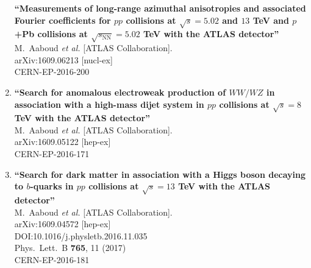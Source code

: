 \documentclass{article}
\begin{document}
\begin{enumerate}
{\bf ``Measurements of long-range azimuthal anisotropies and associated Fourier coefficients for $pp$ collisions at $\sqrt{s}=5.02$ and $13$ TeV and $p$+Pb collisions at $\sqrt{s_{\mathrm{NN}}}=5.02$ TeV with the ATLAS detector''}
  \\{}M.~Aaboud {\it et al.} [ATLAS Collaboration].
  \\{}arXiv:1609.06213 [nucl-ex]
  \\{}CERN-EP-2016-200
\item%
{\bf ``Search for anomalous electroweak production of $WW/WZ$ in association with a high-mass dijet system in $pp$ collisions at $\sqrt{s}=8$ TeV with the ATLAS detector''}
  \\{}M.~Aaboud {\it et al.} [ATLAS Collaboration].
  \\{}arXiv:1609.05122 [hep-ex]
  \\{}CERN-EP-2016-171
\item%
{\bf ``Search for dark matter in association with a Higgs boson decaying to $b$-quarks in $pp$ collisions at $\sqrt{s} = 13$ TeV with the ATLAS detector''}
  \\{}M.~Aaboud {\it et al.} [ATLAS Collaboration].
  \\{}arXiv:1609.04572 [hep-ex]
  \\{}DOI:10.1016/j.physletb.2016.11.035
  \\{}Phys.\ Lett.\ B {\bf 765}, 11 (2017)
  \\{}CERN-EP-2016-181


\end{enumerate}
\end{document}
